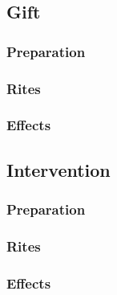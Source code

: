\subsection*{Gift}
\subsubsection*{Preparation}
\subsubsection*{Rites}
\subsubsection*{Effects}

\subsection*{Intervention}
\subsubsection*{Preparation}
\subsubsection*{Rites}
\subsubsection*{Effects}
